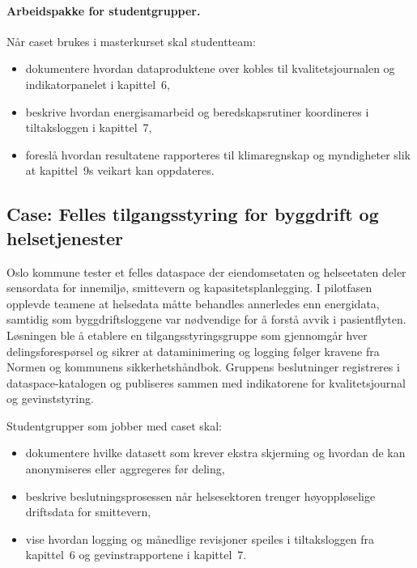 \paragraph{Arbeidspakke for studentgrupper.} Når caset brukes i masterkurset skal studentteam:
\begin{itemize}
    \item dokumentere hvordan dataproduktene over kobles til kvalitetsjournalen og indikatorpanelet i kapittel~6,
    \item beskrive hvordan energisamarbeid og beredskapsrutiner koordineres i tiltaksloggen i kapittel~7,
    \item foreslå hvordan resultatene rapporteres til klimaregnskap og myndigheter slik at kapittel~9s veikart kan oppdateres.
\end{itemize}

\subsection{Case: Felles tilgangsstyring for byggdrift og helsetjenester}
Oslo kommune tester et felles dataspace der eiendomsetaten og helseetaten deler sensordata for innemiljø, smittevern og
kapasitetsplanlegging.\citep{osloeiendom2023strategi,helsedir2023beredskap} I pilotfasen opplevde teamene at helsedata måtte
behandles annerledes enn energidata, samtidig som byggdriftsloggene var nødvendige for å forstå avvik i pasientflyten. Løsningen
ble å etablere en tilgangsstyringsgruppe som gjennomgår hver delingsforespørsel og sikrer at dataminimering og logging følger
kravene fra Normen og kommunens sikkerhetshåndbok. Gruppens beslutninger registreres i dataspace-katalogen og publiseres sammen
med indikatorene for kvalitetsjournal og gevinststyring.

Studentgrupper som jobber med caset skal:
\begin{itemize}
    \item dokumentere hvilke datasett som krever ekstra skjerming og hvordan de kan anonymiseres eller aggregeres før deling,
    \item beskrive beslutningsprosessen når helsesektoren trenger høyoppløselige driftsdata for smittevern,
    \item vise hvordan logging og månedlige revisjoner speiles i tiltaksloggen fra kapittel~6 og gevinstrapportene i kapittel~7.
\end{itemize}

